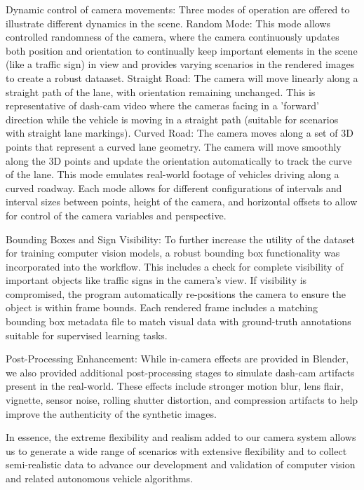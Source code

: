 \documentclass[journal]{IEEEtran}
\begin{document}
Dynamic control of camera movements: Three modes of operation are offered to illustrate different dynamics in the scene. 
Random Mode: This mode allows controlled randomness of the camera, where the camera continuously updates both position and orientation to continually keep important elements in the scene (like a traffic sign) in view and provides varying scenarios in the rendered images to create a robust dataaset. 
Straight Road: The camera will move linearly along a straight path of the lane, with orientation remaining unchanged. This is representative of dash-cam video where the cameras facing in a 'forward' direction while the vehicle is moving in a straight path (suitable for scenarios with straight lane markings). 
Curved Road: The camera moves along a set of 3D points that represent a curved lane geometry. The camera will move smoothly along the 3D points and update the orientation automatically to track the curve of the lane. This mode emulates real-world footage of vehicles driving along a curved roadway. Each mode allows for different configurations of intervals and interval sizes between points, height of the camera, and horizontal offsets to allow for control of the camera variables and perspective.

Bounding Boxes and Sign Visibility: To further increase the utility of the dataset for training computer vision models, a robust bounding box functionality was incorporated into the workflow. This includes a check for complete visibility of important objects like traffic signs in the camera's view. If visibility is compromised, the program automatically re-positions the camera to ensure the object is within frame bounds. Each rendered frame includes a matching bounding box metadata file to match visual data with ground-truth annotations suitable for supervised learning tasks.

Post-Processing Enhancement: While in-camera effects are provided in Blender, we also provided additional post-processing stages to simulate dash-cam artifacts present in the real-world. These effects include stronger motion blur, lens flair, vignette, sensor noise, rolling shutter distortion, and compression artifacts to help improve the authenticity of the synthetic images. 

In essence, the extreme flexibility and realism added to our camera system allows us to generate a wide range of scenarios with extensive flexibility and to collect semi-realistic data to advance our development and validation of computer vision and related autonomous vehicle algorithms.
\end{document}

